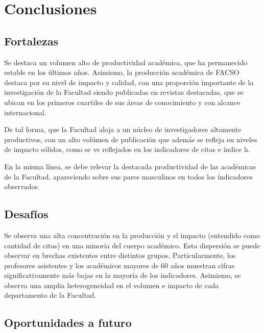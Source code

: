 \documentclass[
  a4paper,
  oneside]{scrbook}
\begin{document}
\section*{Conclusiones}\label{conclusiones}


\subsection*{Fortalezas}\label{fortalezas}

Se destaca un volumen alto de productividad académica, que ha
permanecido estable en los últimos años. Asimismo, la producción
académica de FACSO destaca por su nivel de impacto y calidad, con una
proporción importante de la investigación de la Facultad siendo
publicadas en revistas destacadas, que se ubican en los primeros
cuartiles de sus áreas de conocimiento y con alcance internacional.

De tal forma, que la Facultad aloja a un núcleo de investigadores
altamente productivos, con un alto volúmen de publicación que además se
refleja en niveles de impacto sólidos, como se ve reflejados en los
indicadores de citas e índice h.

En la misma línea, se debe relevar la destacada productividad de las
académicas de la Facultad, apareciendo sobre sus pares masculinos en
todos los índicadores observados.

\subsection*{Desafíos}\label{desafuxedos}

Se observa una alta concentración en la producción y el impacto
(entendido como cantidad de citas) en una minoría del cuerpo académico.
Esta dispersión se puede observar en brechas existentes entre distintos
grupos. Particularmente, los profesores asistentes y los académicos
mayores de 60 años muestran cifras significativamente más bajas en la
mayoría de los indicadores. Asimismo, se observa una amplia
heterogeneidad en el volumen e impacto de cada departamento de la
Facultad.

\subsection*{Oportunidades a futuro}\label{oportunidades-a-futuro}
\end{document}

